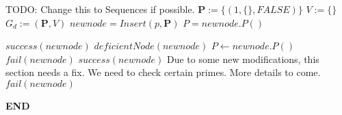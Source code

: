 \documentclass[../paper.tex]{subfiles}
\begin{document}
\begin{algorithmic}
\STATE TODO: Change this to Sequences if possible.
\STATE $\mathbf{P} := \{(1, \{\}, FALSE)\}$
\STATE $V := \{\}$
\STATE $G_d := (\mathbf{P},V)$
	\STATE $newnode = Insert(p,\mathbf{P})$ 
	\STATE $P = newnode.P()$
	\STATE


			\STATE $success(newnode)$
		\ELSE
			\STATE $deficientNode(newnode)$
			\STATE $P \leftarrow newnode.P()$
		\ENDIF
	\ENDIF
			\STATE $fail(newnode)$
		\ENDIF
			\STATE $success(newnode)$
		\ELSE
      \STATE Due to some new modifications, this section needs a
fix. We need to check certain primes. More details to come. 
			\STATE $fail(newnode)$
		\ENDIF
	\ENDIF

\ENDWHILE
%
\end{algorithmic}

\textbf{END}
\end{document}
